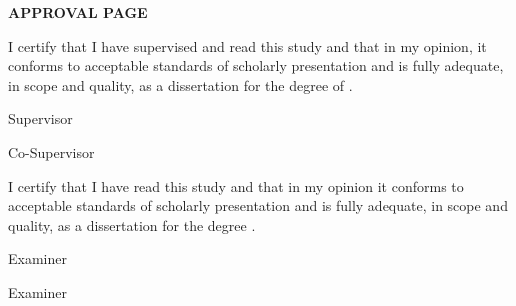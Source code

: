 \documentclass[12pt, a4paper, oneside]{memoir}
\begin{document}
\pagestyle{empty}

\begin{center}
\fontsize{14bp}{16bp}
\textbf{\MakeUppercase{Approval Page}}
\end{center}

\vspace{1.9 cm}

\fontsize{12bp}{14bp}
\noindent I certify that I have supervised and read this study and that in my opinion, it 
conforms to acceptable standards of scholarly presentation and is fully 
adequate, in scope and quality, as a dissertation for the degree of \myDegree.
\\[18pt]

\hfill \makebox[0.35\textwidth]{\dotfill}

\hspace{0.61\textwidth} \mySupervisor

\hspace{0.61\textwidth} Supervisor\\[6pt]

\ifdefined\myCoSupervisor
  \hfill \makebox[0.35\textwidth]{\dotfill}

  \hspace{0.61\textwidth} \myCoSupervisor

  \hspace{0.61\textwidth} Co-Supervisor\\[18pt]
\fi

\ifdefined\myExaminerOne
  \noindent I certify that I have read this study and that in my opinion it 
  conforms to acceptable standards of scholarly presentation and is fully 
  adequate, in scope and quality, as a dissertation for the degree 
  \myDegree.\\[18pt]

  \hfill \makebox[0.35\textwidth]{\dotfill}

  \hspace{0.61\textwidth} \myExaminerOne

  \hspace{0.61\textwidth} Examiner\\[18pt]

  \ifdefined\myExaminerTwo

    \hfill \makebox[0.35\textwidth]{\dotfill}

    \hspace{0.61\textwidth} \myExaminerTwo

    \hspace{0.61\textwidth} Examiner\\[6pt]
  \fi
\fi
\end{document}
